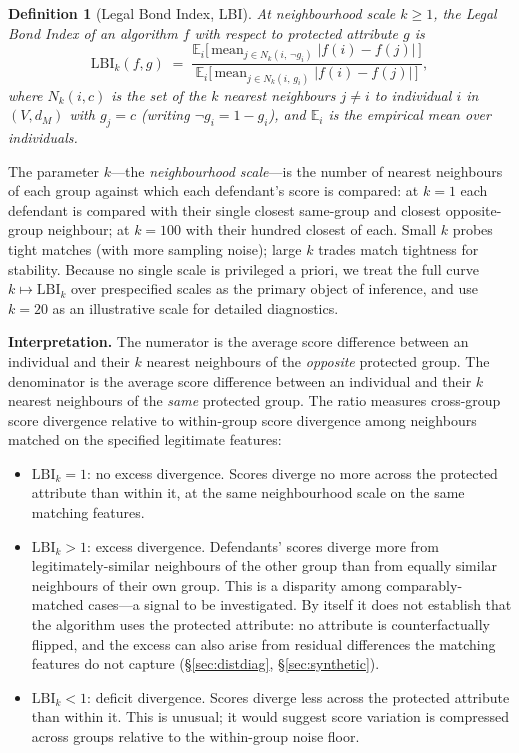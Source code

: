 \documentclass[11pt]{article}
\newtheorem{definition}{Definition}
\begin{document}
\begin{definition}[Legal Bond Index, LBI]
\label{def:lbi}
At neighbourhood scale $k \geq 1$, the Legal Bond Index of an
algorithm $f$ with respect to protected attribute $g$ is
\begin{equation}
\label{eq:lbi}
\mathrm{LBI}_k(f, g)
\;=\;
\frac{\mathbb{E}_i \bigl[\, \text{mean}_{j \in N_k(i,\, \neg g_i)} \;
                            \lvert f(i) - f(j) \rvert\, \bigr]}
     {\mathbb{E}_i \bigl[\, \text{mean}_{j \in N_k(i,\, g_i)} \;
                            \lvert f(i) - f(j) \rvert\, \bigr]},
\end{equation}
where $N_k(i, c)$ is the set of the $k$ nearest neighbours
$j \neq i$ to individual $i$ in $(V, d_M)$ with $g_j = c$ (writing
$\neg g_i = 1 - g_i$), and $\mathbb{E}_i$ is the empirical mean over
individuals.
\end{definition}

The parameter $k$---the \emph{neighbourhood scale}---is the number of
nearest neighbours of each group against which each defendant's score
is compared: at $k = 1$ each defendant is compared with their single
closest same-group and closest opposite-group neighbour; at $k = 100$
with their hundred closest of each. Small $k$ probes tight matches
(with more sampling noise); large $k$ trades match tightness for
stability. Because no single scale is privileged a priori, we treat
the full curve $k \mapsto \mathrm{LBI}_k$ over prespecified scales as
the primary object of inference, and use $k = 20$ as an illustrative
scale for detailed diagnostics.

\textbf{Interpretation.} The numerator is the average score
difference between an individual and their $k$ nearest neighbours of
the \emph{opposite} protected group. The denominator is the average
score difference between an individual and their $k$ nearest neighbours
of the \emph{same} protected group. The ratio measures cross-group
score divergence relative to within-group score divergence among
neighbours matched on the specified legitimate features:
\begin{itemize}[leftmargin=*]
\item $\mathrm{LBI}_k = 1$: no excess divergence. Scores diverge no
more across the protected attribute than within it, at the same
neighbourhood scale on the same matching features.
\item $\mathrm{LBI}_k > 1$: excess divergence. Defendants' scores
diverge more from legitimately-similar neighbours of the other group
than from equally similar neighbours of their own group. This is a
disparity among comparably-matched cases---a signal to be
investigated. By itself it does not establish that the algorithm uses
the protected attribute: no attribute is counterfactually flipped,
and the excess can also arise from residual differences the matching
features do not capture (\S\ref{sec:distdiag},
\S\ref{sec:synthetic}).
\item $\mathrm{LBI}_k < 1$: deficit divergence. Scores diverge less
across the protected attribute than within it. This is unusual; it
would suggest score variation is compressed across groups relative to
the within-group noise floor.
\end{itemize}
\end{document}

